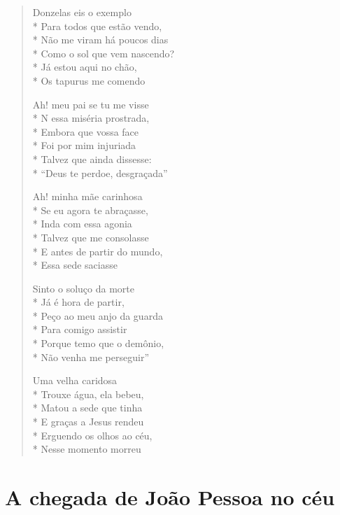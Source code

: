 \begin{verse}
Donzelas eis o exemplo\\*
Para todos que estão vendo,\\*
Não me viram há poucos dias\\*
Como o sol que vem nascendo?\\*
Já estou aqui no chão,\\*
Os tapurus me comendo

Ah! meu pai se tu me visse\\*
N essa miséria prostrada,\\*
Embora que vossa face\\*
Foi por mim injuriada\\*
Talvez que ainda dissesse:\\*
``Deus te perdoe, desgraçada''

Ah! minha mãe carinhosa\\*
Se eu agora te abraçasse,\\*
Inda com essa agonia\\*
Talvez que me consolasse\\*
E antes de partir do mundo,\\*
Essa sede saciasse

Sinto o soluço da morte\\*
Já é hora de partir,\\*
Peço ao meu anjo da guarda\\*
Para comigo assistir\\*
Porque temo que o demônio,\\*
Não venha me perseguir''

Uma velha caridosa\\*
Trouxe água, ela bebeu,\\*
Matou a sede que tinha\\*
E graças a Jesus rendeu\\*
Erguendo os olhos ao céu,\\*
Nesse momento morreu

\end{verse}


\chapter{A chegada de João Pessoa no céu}

